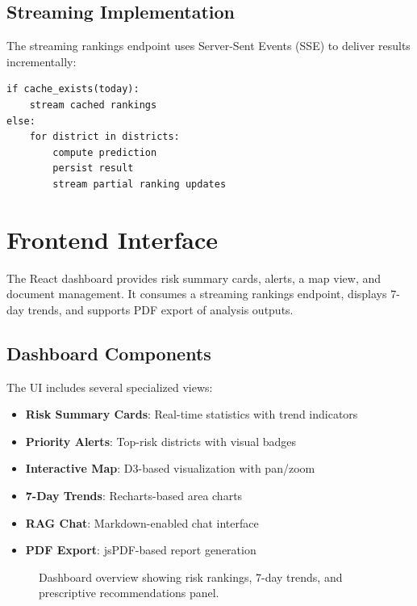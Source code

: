 \documentclass[conference]{IEEEtran}
\begin{document}
\subsection{Streaming Implementation}
The streaming rankings endpoint uses Server-Sent Events (SSE) to deliver results incrementally:

\begin{lstlisting}[caption={Streaming rankings workflow.}, label={lst:stream}]
if cache_exists(today):
    stream cached rankings
else:
    for district in districts:
        compute prediction
        persist result
        stream partial ranking updates
\end{lstlisting}

\section{Frontend Interface}
\label{sec:frontend}

The React dashboard provides risk summary cards, alerts, a map view, and document management. It consumes a streaming rankings endpoint, displays 7-day trends, and supports PDF export of analysis outputs.

\subsection{Dashboard Components}
The UI includes several specialized views:

\begin{itemize}
    \item \textbf{Risk Summary Cards}: Real-time statistics with trend indicators
    \item \textbf{Priority Alerts}: Top-risk districts with visual badges
    \item \textbf{Interactive Map}: D3-based visualization with pan/zoom
    \item \textbf{7-Day Trends}: Recharts-based area charts
    \item \textbf{RAG Chat}: Markdown-enabled chat interface
    \item \textbf{PDF Export}: jsPDF-based report generation
\end{itemize}

\begin{figure}[htbp]
    \centering
    \fbox{\rule{0pt}{1.8in}\rule{0.9\linewidth}{0pt}}
    \caption{Dashboard overview showing risk rankings, 7-day trends, and prescriptive recommendations panel.}
    \label{fig:dashboard}
\end{figure}
\end{document}
